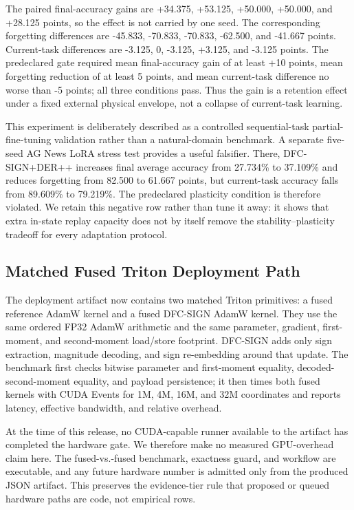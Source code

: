 The paired final-accuracy gains are +34.375, +53.125, +50.000, +50.000, and
+28.125 points, so the effect is not carried by one seed.  The corresponding
forgetting differences are -45.833, -70.833, -70.833, -62.500, and -41.667
points.  Current-task differences are -3.125, 0, -3.125, +3.125, and -3.125
points.  The predeclared gate required mean final-accuracy gain of at least
+10 points, mean forgetting reduction of at least 5 points, and mean
current-task difference no worse than -5 points; all three conditions pass.
Thus the gain is a retention effect under a fixed external physical envelope,
not a collapse of current-task learning.

This experiment is deliberately described as a controlled sequential-task
partial-fine-tuning validation rather than a natural-domain benchmark.  A
separate five-seed AG News LoRA stress test provides a useful falsifier.  There,
DFC-SIGN+DER++ increases final average accuracy from 27.734\% to 37.109\% and
reduces forgetting from 82.500 to 61.667 points, but current-task accuracy
falls from 89.609\% to 79.219\%.  The predeclared plasticity condition is
therefore violated.  We retain this negative row rather than tune it away:
it shows that extra in-state replay capacity does not by itself remove the
stability--plasticity tradeoff for every adaptation protocol.

\subsection{Matched Fused Triton Deployment Path}
\label{sec:triton_v21}

The deployment artifact now contains two matched Triton primitives: a fused
reference AdamW kernel and a fused DFC-SIGN AdamW kernel.  They use the same
ordered FP32 AdamW arithmetic and the same parameter, gradient, first-moment,
and second-moment load/store footprint.  DFC-SIGN adds only sign extraction,
magnitude decoding, and sign re-embedding around that update.  The benchmark
first checks bitwise parameter and first-moment equality, decoded-second-moment
equality, and payload persistence; it then times both fused kernels with CUDA
Events for 1M, 4M, 16M, and 32M coordinates and reports latency, effective
bandwidth, and relative overhead.

At the time of this release, no CUDA-capable runner available to the artifact
has completed the hardware gate.  We therefore make no measured GPU-overhead
claim here.  The fused-vs.-fused benchmark, exactness guard, and workflow are
executable, and any future hardware number is admitted only from the produced
JSON artifact.  This preserves the evidence-tier rule that proposed or queued
hardware paths are code, not empirical rows.
